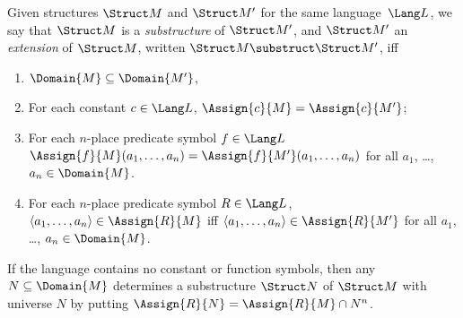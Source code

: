 \documentclass[../../include/open-logic-section]{subfiles}
\begin{document}

\begin{defn}
Given structures $\Struct M$ and $\Struct M'$ for the same language~$\Lang L$,
we say that $\Struct M$ is a \emph{substructure} of $\Struct M'$, and
$\Struct M'$ an \emph{extension} of $\Struct M$, written $\Struct M
\substruct \Struct M'$, iff
\begin{enumerate}
\item $\Domain{M} \subseteq \Domain{M'}$,
\item For each constant $c \in \Lang L$, $\Assign{c}{M} =
    \Assign{c}{M'}$;
\item For each $n$-place predicate symbol $f \in \Lang L$
  $\Assign{f}{M}(a_1, \dots, a_n) = \Assign{f}{M'}(a_1, \dots, a_n)$
  for all $a_1$, \dots, $a_n \in \Domain{M}$.
\item For each $n$-place predicate symbol $R \in \Lang L$, $\langle
  a_1, \dots, a_n\rangle \in \Assign{R}{M}$ iff $\langle a_1, \dots,
  a_n\rangle \in \Assign{R}{M'}$ for all $a_1$, \dots, $a_n \in
  \Domain{M}$.
\end{enumerate}
\end{defn}

\begin{rem}
If the language contains no constant or function symbols, then any $N
\subseteq \Domain{M}$ determines a substructure $\Struct N$ of
$\Struct M$ with universe $N$ by putting $\Assign{R}{N} =
\Assign{R}{M} \cap N^n$.
\end{rem}

\end{document}
